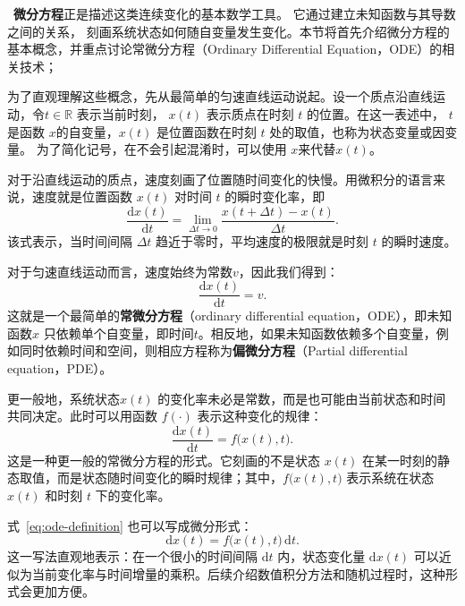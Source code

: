 ~\textbf{微分方程}正是描述这类连续变化的基本数学工具。
它通过建立未知函数与其导数之间的关系，
刻画系统状态如何随自变量发生变化。本节将首先介绍微分方程的基本概念，并重点讨论常微分方程（Ordinary Differential Equation，ODE）的相关技术；

为了直观理解这些概念，先从最简单的匀速直线运动说起。设一个质点沿直线运动，令\(t \in \mathbb{R}\) 表示当前时刻， \(x(t)\) 表示质点在时刻 \(t\) 的位置。在这一表述中， \(t\) 是函数 \(x\)的自变量，\(x(t)\) 是位置函数在时刻 \(t\) 处的取值，也称为状态变量或因变量。 为了简化记号，在不会引起混淆时，可以使用 \(x\)来代替\(x(t)\)。

对于沿直线运动的质点，速度刻画了位置随时间变化的快慢。用微积分的语言来说，速度就是位置函数 \(x(t)\) 对时间 \(t\) 的瞬时变化率，即
\begin{equation}
\frac{\mathrm{d}x(t)}{\mathrm{d}t}
=
\lim_{\Delta t \to 0}
\frac{x(t+\Delta t)-x(t)}{\Delta t}.
\end{equation}
该式表示，当时间间隔 \(\Delta t\) 趋近于零时，平均速度的极限就是时刻 \(t\) 的瞬时速度。

对于匀速直线运动而言，速度始终为常数\(v\)，因此我们得到：
\begin{equation}
\frac{\mathrm{d}x(t)}{\mathrm{d}t}
=
v.
\label{eq:constant-velocity-ode}
\end{equation}
这就是一个最简单的\textbf{常微分方程}（ordinary differential equation，ODE），即未知函数\(x\) 只依赖单个自变量，即时间\(t\)。相反地，如果未知函数依赖多个自变量，例如同时依赖时间和空间，则相应方程称为\textbf{偏微分方程}（Partial differential equation，PDE）。

更一般地，系统状态\(x(t)\) 的变化率未必是常数，而是也可能由当前状态和时间共同决定。此时可以用函数 \(f(\cdot)\) 表示这种变化的规律：
\begin{equation}
\frac{\mathrm{d}x(t)}{\mathrm{d}t}
=
f\bigl(x(t),t\bigr).
\label{eq:ode-definition}
\end{equation}
这是一种更一般的常微分方程的形式。它刻画的不是状态 \(x(t)\) 在某一时刻的静态取值，而是状态随时间变化的瞬时规律；其中，\(f\bigl(x(t),t\bigr)\) 表示系统在状态 \(x(t)\) 和时刻 \(t\) 下的变化率。

式~\eqref{eq:ode-definition} 也可以写成微分形式：
\begin{equation}
\mathrm{d}x(t)
=
f\bigl(x(t),t\bigr)\,\mathrm{d}t.
\label{eq:ode-differential-form}
\end{equation}
这一写法直观地表示：在一个很小的时间间隔 \(\mathrm{d}t\) 内，状态变化量 \(\mathrm{d}x(t)\) 可以近似为当前变化率与时间增量的乘积。后续介绍数值积分方法和随机过程时，这种形式会更加方便。

